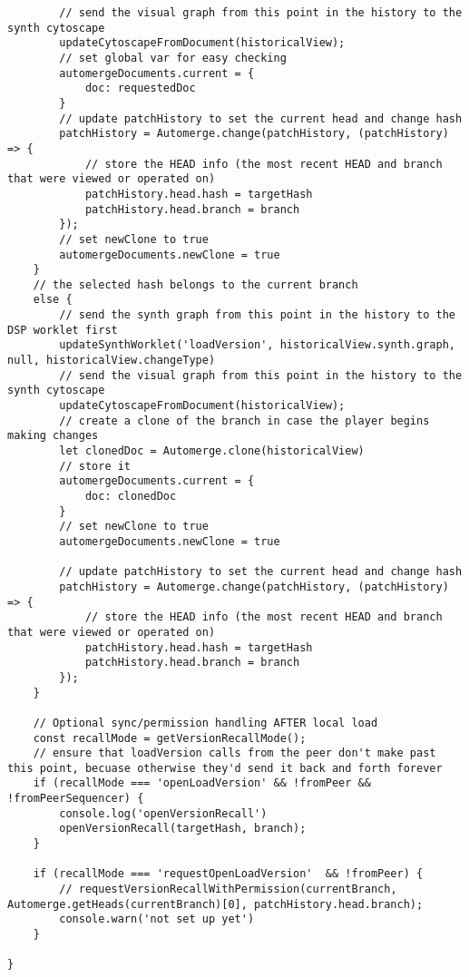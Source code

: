 \begin{lstlisting}
        // send the visual graph from this point in the history to the synth cytoscape
        updateCytoscapeFromDocument(historicalView);
        // set global var for easy checking
        automergeDocuments.current = {
            doc: requestedDoc
        }
        // update patchHistory to set the current head and change hash
        patchHistory = Automerge.change(patchHistory, (patchHistory) => {
            // store the HEAD info (the most recent HEAD and branch that were viewed or operated on)
            patchHistory.head.hash = targetHash
            patchHistory.head.branch = branch
        });
        // set newClone to true
        automergeDocuments.newClone = true
    }
    // the selected hash belongs to the current branch
    else {
        // send the synth graph from this point in the history to the DSP worklet first
        updateSynthWorklet('loadVersion', historicalView.synth.graph, null, historicalView.changeType)
        // send the visual graph from this point in the history to the synth cytoscape
        updateCytoscapeFromDocument(historicalView);
        // create a clone of the branch in case the player begins making changes
        let clonedDoc = Automerge.clone(historicalView)
        // store it
        automergeDocuments.current = {
            doc: clonedDoc
        }
        // set newClone to true
        automergeDocuments.newClone = true

        // update patchHistory to set the current head and change hash
        patchHistory = Automerge.change(patchHistory, (patchHistory) => {
            // store the HEAD info (the most recent HEAD and branch that were viewed or operated on)
            patchHistory.head.hash = targetHash
            patchHistory.head.branch = branch
        });
    }

    // Optional sync/permission handling AFTER local load
    const recallMode = getVersionRecallMode();
    // ensure that loadVersion calls from the peer don't make past this point, becuase otherwise they'd send it back and forth forever 
    if (recallMode === 'openLoadVersion' && !fromPeer && !fromPeerSequencer) {
        console.log('openVersionRecall')
        openVersionRecall(targetHash, branch);
    }

    if (recallMode === 'requestOpenLoadVersion'  && !fromPeer) {
        // requestVersionRecallWithPermission(currentBranch, Automerge.getHeads(currentBranch)[0], patchHistory.head.branch);
        console.warn('not set up yet')
    }

} 
\end{lstlisting}


